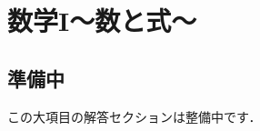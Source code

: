 \documentclass[../../../ms_a.tex]{subfiles}
\begin{document}
\section{数学I～数と式～}

\subsection*{準備中}
この大項目の解答セクションは整備中です．
\end{document}
